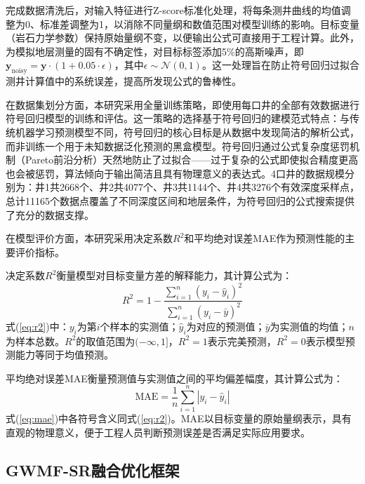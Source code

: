 \documentclass[a4paper,12pt]{ctexart}
\begin{document}
完成数据清洗后，对输入特征进行Z-score标准化处理，将每条测井曲线的均值调整为0、标准差调整为1，以消除不同量纲和数值范围对模型训练的影响。目标变量（岩石力学参数）保持原始量纲不变，以便输出公式可直接用于工程计算。此外，为模拟地层测量的固有不确定性，对目标标签添加5\%的高斯噪声，即$\mathbf{y}_{\text{noisy}} = \mathbf{y} \cdot (1 + 0.05 \cdot \epsilon)$，其中$\epsilon \sim \mathcal{N}(0, 1)$。这一处理旨在防止符号回归过拟合测井计算值中的系统误差，提高所发现公式的鲁棒性。

在数据集划分方面，本研究采用全量训练策略，即使用每口井的全部有效数据进行符号回归模型的训练和评估。这一策略的选择基于符号回归的建模范式特点：与传统机器学习预测模型不同，符号回归的核心目标是从数据中发现简洁的解析公式，而非训练一个用于未知数据泛化预测的黑盒模型。符号回归通过公式复杂度惩罚机制（Pareto前沿分析）天然地防止了过拟合——过于复杂的公式即使拟合精度更高也会被惩罚，算法倾向于输出简洁且具有物理意义的表达式。4口井的数据规模分别为：井1共2668个、井2共4077个、井3共1144个、井4共3276个有效深度采样点，总计11165个数据点覆盖了不同深度区间和地层条件，为符号回归的公式搜索提供了充分的数据支撑。

在模型评价方面，本研究采用决定系数$R^2$和平均绝对误差MAE作为预测性能的主要评价指标。

决定系数$R^2$衡量模型对目标变量方差的解释能力，其计算公式为：
\begin{equation}
  R^2 = 1 - \frac{\sum_{i=1}^{n}(y_i - \hat{y}_i)^2}{\sum_{i=1}^{n}(y_i - \bar{y})^2} \tag{10}
  \label{eq:r2}
\end{equation}
式(\ref{eq:r2})中：$y_i$为第$i$个样本的实测值；$\hat{y}_i$为对应的预测值；$\bar{y}$为实测值的均值；$n$为样本总数。$R^2$的取值范围为$(-\infty, 1]$，$R^2=1$表示完美预测，$R^2=0$表示模型预测能力等同于均值预测。

平均绝对误差MAE衡量预测值与实测值之间的平均偏差幅度，其计算公式为：
\begin{equation}
  \text{MAE} = \frac{1}{n}\sum_{i=1}^{n}|y_i - \hat{y}_i| \tag{11}
  \label{eq:mae}
\end{equation}
式(\ref{eq:mae})中各符号含义同式(\ref{eq:r2})。MAE以目标变量的原始量纲表示，具有直观的物理意义，便于工程人员判断预测误差是否满足实际应用要求。

\subsection{GWMF-SR融合优化框架}
\end{document}
